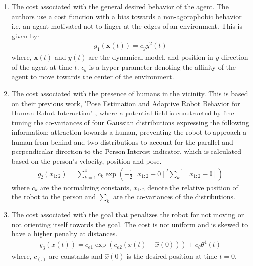 \begin{enumerate}
	\item The cost associated with the general desired behavior of the agent. The authors use a cost function with a bias towards a non-agoraphobic behavior i.e. an agent motivated not to linger at the edges of an environment. This is given by:
	\begin{align}
	g_{1}(\textbf{x}(t)) = c_{y}y^{2}(t)
	\end{align}
	where, $\textbf{x}(t)$ and $y(t)$ are the dynamical model, and position in $y$ direction of the agent at time $t$. $c_y$ is a hyper-parameter denoting the affinity of the agent to move towards the center of the environment.
	\item The cost associated with the presence of humans in the vicinity. This is based on their previous work, "Pose Estimation and Adaptive Robot Behavior for Human-Robot Interaction" \cite{svenstrup_pose_estimation_2009}, where a potential field is constructed by fine-tuning the co-variances of four Gaussian distributions expressing the following information: attraction towards a human, preventing the robot to approach a human from behind and two distributions to account for the parallel and perpendicular direction to the Person Interest indicator, which is calculated based on the person's velocity, position and pose.  
	\begin{align}
	g_{2}(x_{1:2}) = \sum_{k=1}^{4}c_{k}\exp(-\frac{1}{2}[x_{1:2} - 0]^{T}\sum^{-1}_{k}[x_{1:2} - 0])
	\end{align} 
	where $c_{k}$ are the normalizing constants, $x_{1:2}$ denote the relative position of the robot to the person and $\sum_k$ are the co-variances of the distributions.
	\item The cost associated with the goal that penalizes the robot for not moving or not orienting itself towards the goal. The cost is not uniform and is skewed to have a higher penalty at  distances.
	\begin{align}
	g_{3}(x(t)) = c_{e1}\exp(c_{e2}(x(t) - \hat{x}(0))) + c_{\theta}\theta^{4}(t)
	\end{align}
	where, $c_{(.)}$ are constants and $\hat{x}(0)$ is the desired position at time $t=0$.
\end{enumerate}


